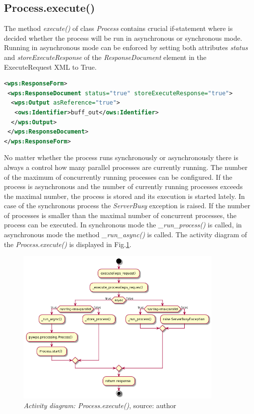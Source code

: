 \subsection{Process.execute()}
The method \textit{execute()} of class \textit{Process} contains crucial if-statement where is decided whether the process will be
run in asynchronous or synchronous mode. Running in asynchronous mode can be enforced by setting both attributes \textit{status} and \textit{storeExecuteResponse} of the \textit{ResponseDocument} element in the ExecuteRequest XML to True.

\newpage
\begin{lstlisting}[basicstyle=\small,caption={ReponseForm element of ExecuteRequest XML},language=XML,label={lst:Execute_ResponseForm}]
<wps:ResponseForm>
 <wps:ResponseDocument status="true" storeExecuteResponse="true">
  <wps:Output asReference="true">
   <ows:Identifier>buff_out</ows:Identifier>
  </wps:Output>
 </wps:ResponseDocument>
</wps:ResponseForm>
\end{lstlisting}
\bigskip 

No matter whether the process runs synchronously or asynchronously there is always a control how many parallel processes are currently
running. The number of the maximum of concurrently running processes can be configured. If the process is asynchronous and the number of currently running processes exceeds the maximal number, the process is stored and its execution is started lately. In case of the synchronous process the \textit{ServerBusy} exception is raised. If the number of processes is smaller than the maximal number of 
concurrent processes, the process can be executed. In synchronous mode the \textit{\_run\_process()} is called, in asynchronous mode the method \textit{\_run\_async()} is called. The activity diagram of the \textit{Process.execute()} is displayed in Fig.\ref{fig:Diag_process_execute}.

\begin{figure}[h!]
\centering
\includegraphics[width=0.9\textwidth]{img/Diag_process_execute.png}
\caption{\textit{Activity diagram: Process.execute()}, source: author}
\label{fig:Diag_process_execute}
\end{figure}

